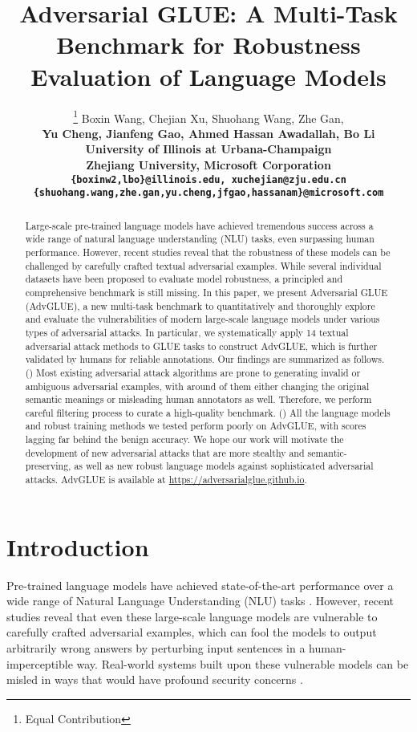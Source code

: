 \documentclass{article}
\title{Adversarial GLUE: A Multi-Task Benchmark for Robustness Evaluation of Language Models}
\author{\thanks{Equal Contribution} Boxin Wang, Chejian Xu, Shuohang Wang, Zhe Gan, \\
  \bf Yu Cheng, Jianfeng Gao, Ahmed Hassan Awadallah, Bo Li \\
  University of Illinois at Urbana-Champaign \\
  Zhejiang University,
  Microsoft Corporation\\
  \texttt{\small\{boxinw2,lbo\}@illinois.edu, xuchejian@zju.edu.cn}  \\
  \texttt{\small \{shuohang.wang,zhe.gan,yu.cheng,jfgao,hassanam\}@microsoft.com} \\ 
}
\newcommand{\method}{AdvGLUE\xspace}
\begin{document}
\maketitle

\begin{abstract}
Large-scale pre-trained language models have achieved tremendous success across a wide range of natural language understanding (NLU) tasks, even surpassing human performance. However, recent studies reveal that the robustness of these models can be challenged by carefully crafted textual adversarial examples. While several individual datasets have been proposed to evaluate model robustness,
a principled and comprehensive benchmark is still missing. In this paper, we present Adversarial GLUE (\method), a new multi-task benchmark to quantitatively and thoroughly explore and evaluate the vulnerabilities of modern large-scale language models under various types of adversarial attacks. In particular, we systematically apply 14 textual adversarial attack methods to GLUE tasks to construct AdvGLUE, which is further validated by humans for reliable annotations.
Our findings are summarized as follows.
() Most existing adversarial attack algorithms are prone to generating invalid or ambiguous adversarial examples, with around  of them either changing the original semantic meanings or misleading  human annotators as well. Therefore, we perform careful filtering process to curate a high-quality benchmark.
() All the language models and robust training methods we tested perform poorly on \method, with scores lagging far behind the benign accuracy.
We hope our work will motivate the development of new adversarial attacks that are more stealthy and semantic-preserving, as well as new robust language models against sophisticated adversarial attacks. AdvGLUE is available at \url{https://adversarialglue.github.io}.
\end{abstract}

\section{Introduction}

Pre-trained language models \citep{bert,roberta,Lan2019ALBERTAL,Yang2019XLNetGA,he2020deberta,zhang2019ernie,smart,clark2020electra} have achieved state-of-the-art performance over a wide range of Natural Language Understanding (NLU) tasks \citep{wang2018glue,wang2019superglue,advsquad,advfever,anli}. 
However, recent studies \citep{textfooler,comattack,t3,bertattack,bae} reveal that even these large-scale language models are vulnerable to carefully crafted adversarial examples, which can fool the models to output arbitrarily wrong answers by perturbing input sentences in a human-imperceptible way. 
Real-world systems built upon these vulnerable models can be misled in ways that would have profound security concerns \citep{textbugger,textshield}.
\end{document}

